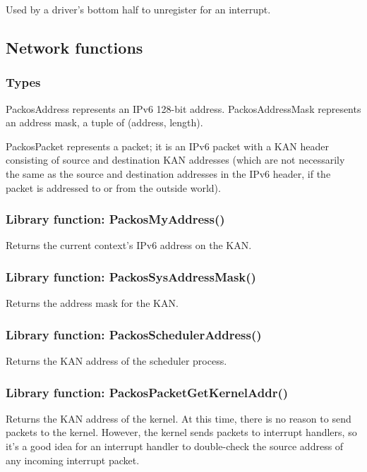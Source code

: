 \documentclass{article}
\begin{document}
Used by a driver's bottom half to unregister for an interrupt.

\subsection{Network functions}

\subsubsection{Types}

PackosAddress represents an IPv6 128-bit address.  PackosAddressMask
represents an address mask, a tuple of (address, length).

PackosPacket represents a packet; it is an IPv6 packet with a KAN
header consisting of source and destination KAN addresses (which are
not necessarily the same as the source and destination addresses in
the IPv6 header, if
the packet is addressed to or from the outside world).

\subsubsection{Library function: PackosMyAddress()}

Returns the current context's IPv6 address on the KAN.

\subsubsection{Library function: PackosSysAddressMask()}

Returns the address mask for the KAN.

\subsubsection{Library function: PackosSchedulerAddress()}

Returns the KAN address of the scheduler process.

\subsubsection{Library function: PackosPacketGetKernelAddr()}

Returns the KAN address of the kernel.  At this time, there is no
reason to send packets to the kernel.  However, the kernel sends
packets to interrupt handlers, so it's a good idea for an interrupt
handler to double-check the source address of any incoming interrupt
packet.
\end{document}
